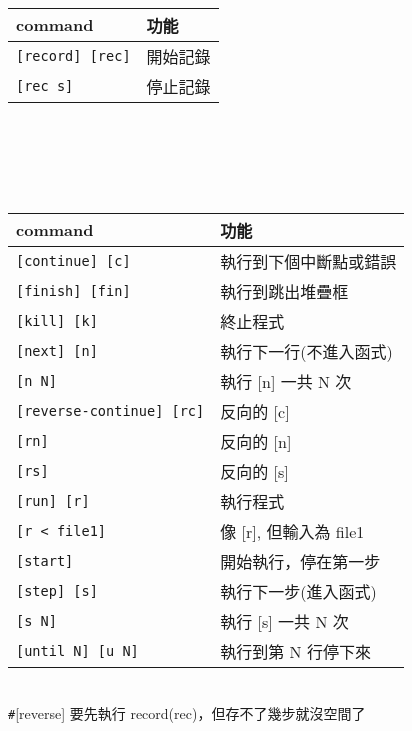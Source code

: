 \begin{center}
     \\
    \begin{tabular}{|p{2.7cm}|p{2.7cm}|}
        \hline
        command                         & 功能 \\
        \hline
        \verb|[record] [rec]|           & 開始記錄 \\
        \verb|[rec s]|                  & 停止記錄 \\
        \hline
    \end{tabular} \\
    \hspace{\fill} \\
    \hspace{\fill} \\

     \\
    \begin{tabular}{|p{2.7cm}|p{2.7cm}|}
        \hline
        command                         & 功能 \\
        \hline
        \verb|[continue] [c]|           & 執行到下個中斷點或錯誤 \\
        \verb|[finish] [fin]|           & 執行到跳出堆疊框 \\
        \verb|[kill] [k]|               & 終止程式 \\
        \verb|[next] [n]|               & 執行下一行(不進入函式) \\
        \verb|[n N]|                    & 執行 [n] 一共 N 次 \\
        \verb|[reverse-continue] [rc]|  & 反向的 [c] \\
        \verb|[rn]|                     & 反向的 [n] \\
        \verb|[rs]|                     & 反向的 [s] \\
        \verb|[run] [r]|                & 執行程式 \\
        \verb|[r < file1]|              & 像 [r], 但輸入為 file1 \\
        \verb|[start]|                  & 開始執行，停在第一步 \\
        \verb|[step] [s]|               & 執行下一步(進入函式) \\
        \verb|[s N]|                    & 執行 [s] 一共 N 次 \\
        \verb|[until N] [u N]|          & 執行到第 N 行停下來 \\
        \hline
    \end{tabular} \\
    \verb|#|[reverse] 要先執行 record(rec)，但存不了幾步就沒空間了
    \columnbreak


\end{center}
